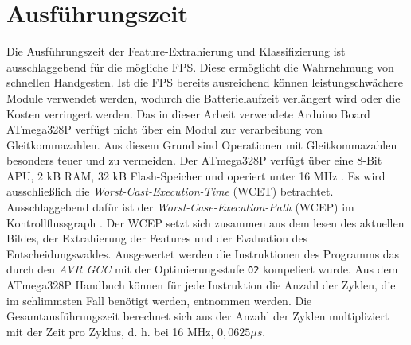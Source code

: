 \section{Ausführungszeit}
\label{sec:eval_speed}
Die Ausführungszeit der Feature-Extrahierung und Klassifizierung ist ausschlaggebend für die mögliche FPS. Diese ermöglicht die Wahrnehmung von schnellen Handgesten. Ist die FPS bereits ausreichend
können leistungschwächere Module verwendet werden, wodurch die Batterielaufzeit verlängert wird oder die Kosten verringert werden.
\newline
\newline
Das in dieser Arbeit verwendete Arduino Board ATmega328P verfügt nicht über ein Modul zur verarbeitung von Gleitkommazahlen. Aus diesem Grund sind Operationen mit Gleitkommazahlen besonders teuer
und zu vermeiden. Der ATmega328P verfügt über eine 8-Bit APU, 2 kB RAM, 32 kB Flash-Speicher und operiert unter 16 MHz \cite{atmega328p}.
\newline
\newline
Es wird ausschließlich die \textit{Worst-Cast-Execution-Time} (WCET) betrachtet. Ausschlaggebend dafür ist der \textit{Worst-Case-Execution-Path} (WCEP) im Kontrollflussgraph \cite{wcc_intro}. Der WCEP
setzt sich zusammen aus dem lesen des aktuellen Bildes, der Extrahierung der Features und der Evaluation des Entscheidungswaldes.
\newline
\newline
Ausgewertet werden die Instruktionen des Programms das durch den \textit{AVR GCC} mit der Optimierungsstufe \texttt{O2} kompeliert wurde. Aus dem ATmega328P Handbuch \cite{atmega328p} können
für jede Instruktion die Anzahl der Zyklen, die im schlimmsten Fall benötigt werden, entnommen werden. Die Gesamtausführungszeit berechnet sich aus der Anzahl der Zyklen multipliziert mit der Zeit
pro Zyklus, d. h. bei 16 MHz, $0,0625 \mu s$.



